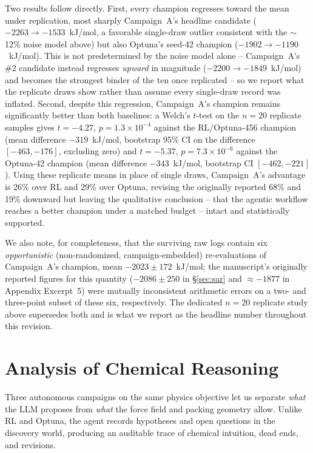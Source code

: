\documentclass[twocolumn]{fairmeta}
\begin{document}
Two results follow directly.
First, every champion regresses toward the mean under replication, most sharply Campaign~A's headline candidate ($-2263 \to -1533$~kJ/mol, a favorable single-draw outlier consistent with the ${\sim}$12\% noise model above) but also Optuna's seed-42 champion ($-1902 \to -1190$~kJ/mol).
This is not predetermined by the noise model alone -- Campaign~A's \#2 candidate instead regresses \emph{upward} in magnitude ($-2200 \to -1849$~kJ/mol) and becomes the strongest binder of the ten once replicated -- so we report what the replicate draws show rather than assume every single-draw record was inflated.
Second, despite this regression, Campaign~A's champion remains significantly better than both baselines: a Welch's $t$-test on the $n{=}20$ replicate samples gives $t{=}-4.27$, $p{=}1.3{\times}10^{-4}$ against the RL/Optuna-456 champion (mean difference $-319$~kJ/mol, bootstrap 95\% CI on the difference $[-463,-176]$, excluding zero) and $t{=}-5.37$, $p{=}7.3{\times}10^{-6}$ against the Optuna-42 champion (mean difference $-343$~kJ/mol, bootstrap CI $[-462,-221]$).
Using these replicate means in place of single draws, Campaign~A's advantage is 26\% over RL and 29\% over Optuna, revising the originally reported 68\% and 19\% downward but leaving the qualitative conclusion -- that the agentic workflow reaches a better champion under a matched budget -- intact and statistically supported.

We also note, for completeness, that the surviving raw logs contain six \emph{opportunistic} (non-randomized, campaign-embedded) re-evaluations of Campaign~A's champion, mean $-2023 \pm 172$~kJ/mol; the manuscript's originally reported figures for this quantity ($-2086 \pm 250$ in \S\ref{sec:sar} and ${\approx}{-1877}$ in Appendix Excerpt~5) were mutually inconsistent arithmetic errors on a two- and three-point subset of these six, respectively.
The dedicated $n{=}20$ replicate study above supersedes both and is what we report as the headline number throughout this revision.

\section{Analysis of Chemical Reasoning}
\label{sec:analysis}

Three autonomous campaigns on the same physics objective let us separate \emph{what} the LLM proposes from \emph{what} the force field and packing geometry allow.
Unlike RL and Optuna, the agent records hypotheses and open questions in the discovery world, producing an auditable trace of chemical intuition, dead ends, and revisions.
\end{document}
